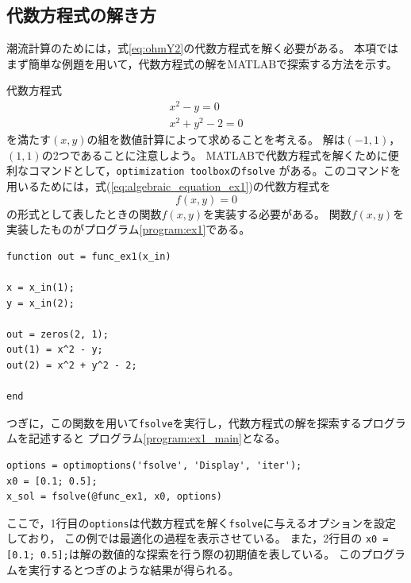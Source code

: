 \documentclass[tombow,dvipdfmx]{corona-a5-1.1}
\begin{document}
\subsection{代数方程式の解き方}
潮流計算のためには，式\ref{eq:ohmY2}の代数方程式を解く必要がある。
本項ではまず簡単な例題を用いて，代数方程式の解をMATLABで探索する方法を示す。
\begin{例}[代数方程式の解の探索]\label{ex:algenraic_equation_ex1}
代数方程式
\begin{subequations}\label{eq:algebraic_equation_ex1}
\begin{align}
x^2 - y = 0\\
x^2 + y^2 - 2 = 0
\end{align}
\end{subequations}
を満たす$(x, y)$の組を数値計算によって求めることを考える。
解は$(-1, 1)$，$(1, 1)$の2つであることに注意しよう。
MATLABで代数方程式を解くために便利なコマンドとして，\verb|optimization toolbox|の\verb|fsolve|
がある。このコマンドを用いるためには，式(\ref{eq:algebraic_equation_ex1})の代数方程式を
\[
f(x,y)=0
\]
の形式として表したときの関数$f(x,y)$を実装する必要がある。
関数$f(x,y)$を実装したものがプログラム\nobreak\ref{program:ex1}である。

\smallskip
\begin{PROGRAMA}[count,title={func\_ex1.m}]\label{program:ex1}
\begin{verbatim}
function out = func_ex1(x_in)

x = x_in(1);
y = x_in(2);

out = zeros(2, 1);
out(1) = x^2 - y;
out(2) = x^2 + y^2 - 2;

end
\end{verbatim}
\end{PROGRAMA}

つぎに，この関数を用いて\verb|fsolve|を実行し，代数方程式の解を探索するプログラムを記述すると
プログラム\nobreak\ref{program:ex1_main}となる。
\smallskip
\begin{PROGRAMA}[count,title={main\_ex1.m}]\label{program:ex1_main}
\begin{verbatim}
options = optimoptions('fsolve', 'Display', 'iter');
x0 = [0.1; 0.5];
x_sol = fsolve(@func_ex1, x0, options)
\end{verbatim}
\end{PROGRAMA}

ここで，1行目の\verb|options|は代数方程式を解く\verb|fsolve|に与えるオプションを設定しており，
この例では最適化の過程を表示させている。
また，2行目の
\verb|x0 = [0.1; 0.5];|は解の数値的な探索を行う際の初期値を表している。
このプログラムを実行するとつぎのような結果が得られる。


\end{例}
\end{document}
